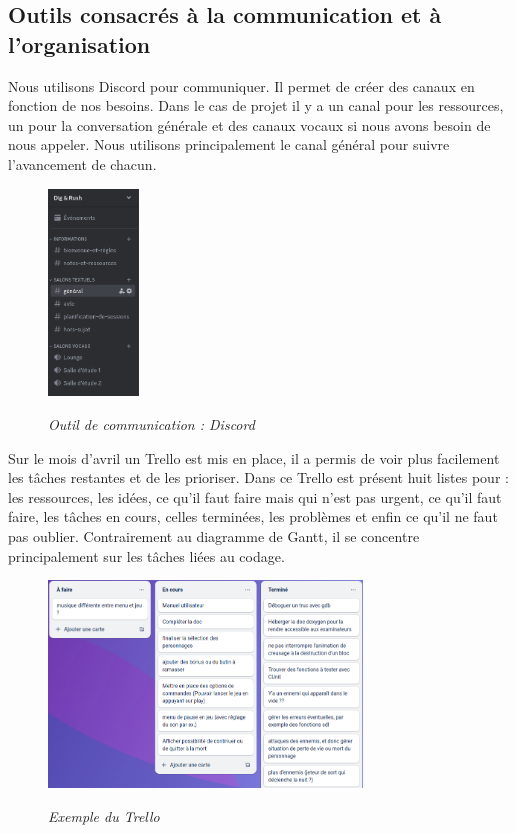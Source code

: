 \documentclass[a4paper,12pt]{article}
\begin{document}
\subsection{Outils consacrés à la communication et à l'organisation}
Nous utilisons Discord pour communiquer. 
Il permet de créer des canaux en fonction de nos besoins. 
Dans le cas de projet il y a un canal pour les ressources, un pour la conversation générale et des canaux vocaux si nous avons besoin de nous appeler. 
Nous utilisons principalement le canal général pour suivre l’avancement de chacun.

\begin{figure}[h]
\begin{center}
\includegraphics[height=5.5cm]{img/discord.png}\\
\caption{{\emph{Outil de communication : Discord}}}
\label{discord}
\end{center}
\end{figure}

Sur le mois d’avril un Trello est mis en place, il a permis de voir plus facilement les tâches restantes et de les prioriser. 
Dans ce Trello est présent huit listes pour : les ressources, les idées, ce qu’il faut faire mais qui n’est pas urgent, ce qu’il faut faire, les tâches en cours, celles terminées, les problèmes et enfin ce qu’il ne faut pas oublier. 
Contrairement au diagramme de Gantt, il se concentre principalement sur les tâches liées au codage.

\begin{figure}[h]
\begin{center}
\includegraphics[height=5.5cm]{img/capture_trello.png}\\
\caption{{\emph{Exemple du Trello}}}
\label{trello}
\end{center}
\end{figure}
\end{document}
